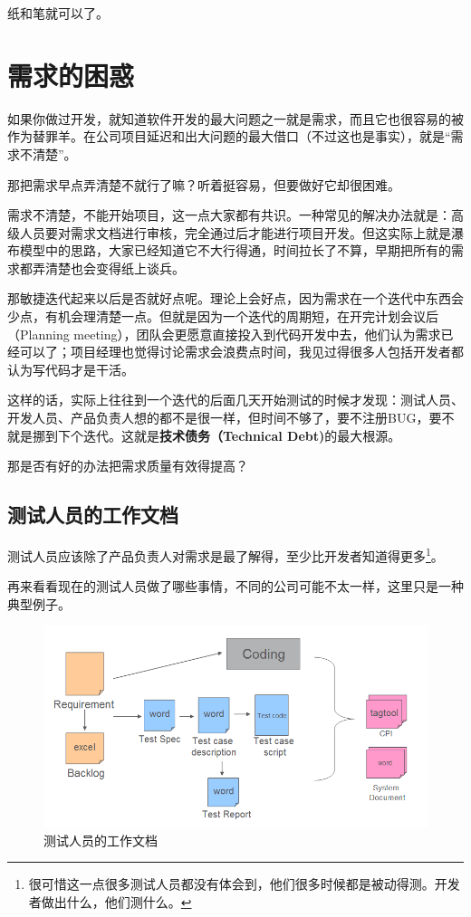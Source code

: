 纸和笔就可以了。

\section{需求的困惑}
\label{需求的困惑}

如果你做过开发，就知道软件开发的最大问题之一就是需求，而且它也很容易的被作为替罪羊。在公司项目延迟和出大问题的最大借口（不过这也是事实），就是“需求不清楚”。

那把需求早点弄清楚不就行了嘛？听着挺容易，但要做好它却很困难。

需求不清楚，不能开始项目，这一点大家都有共识。一种常见的解决办法就是：高级人员要对需求文档进行审核，完全通过后才能进行项目开发。但这实际上就是瀑布模型中的思路，大家已经知道它不大行得通，时间拉长了不算，早期把所有的需求都弄清楚也会变得纸上谈兵。

那敏捷迭代起来以后是否就好点呢。理论上会好点，因为需求在一个迭代中东西会少点，有机会理清楚一点。但就是因为一个迭代的周期短，在开完计划会议后（Planning meeting），团队会更愿意直接投入到代码开发中去，他们认为需求已经可以了；项目经理也觉得讨论需求会浪费点时间，我见过得很多人包括开发者都认为写代码才是干活。

这样的话，实际上往往到一个迭代的后面几天开始测试的时候才发现：测试人员、开发人员、产品负责人想的都不是很一样，但时间不够了，要不注册BUG，要不就是挪到下个迭代。这就是\textbf{技术债务（Technical Debt)}的最大根源。

那是否有好的办法把需求质量有效得提高？

\subsection{测试人员的工作文档}
\label{测试人员的工作文档}

测试人员应该除了产品负责人对需求是最了解得，至少比开发者知道得更多\footnote{很可惜这一点很多测试人员都没有体会到，他们很多时候都是被动得测。开发者做出什么，他们测什么。}。

再来看看现在的测试人员做了哪些事情，不同的公司可能不太一样，这里只是一种典型例子。

\begin{figure}[htbp]
\centering
\includegraphics[keepaspectratio,width=\textwidth,height=0.75\textheight]{img/18333fig0501-tn.png}
\caption{测试人员的工作文档}
\end{figure}

